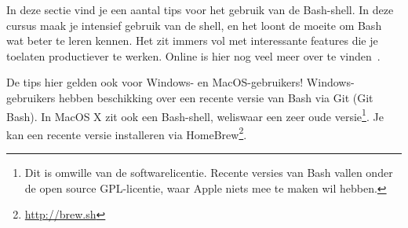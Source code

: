 In deze sectie vind je een aantal tips voor het gebruik van de Bash-shell. In deze cursus maak je intensief gebruik van de shell, en het loont de moeite om Bash wat beter te leren kennen. Het zit immers vol met interessante features die je toelaten productiever te werken. Online is hier nog veel meer over te vinden~\autocite{Rowe2009}.

De tips hier gelden ook voor Windows- en MacOS-gebruikers! Windows-gebruikers hebben beschikking over een recente versie van Bash via Git (Git Bash). In MacOS X zit ook een Bash-shell, weliswaar een zeer oude versie\footnote{Dit is omwille van de softwarelicentie. Recente versies van Bash vallen onder de open source GPL-licentie, waar Apple niets mee te maken wil hebben.}. Je kan een recente versie installeren via HomeBrew\footnote{\url{http://brew.sh}}.

